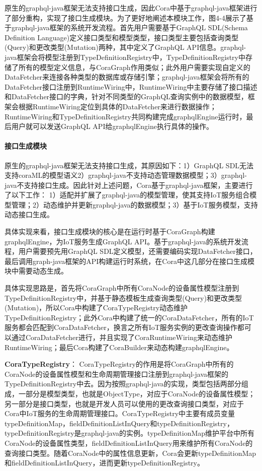 \documentclass[winfonts,master,twoside]{njuthesis}
\begin{document}
原生的graphql-java框架无法支持接口生成，因此Cora中基于graphql-java框架进行了部分重构，实现了接口生成模块。为了更好地阐述本模块工作，图4-4展示了基于graphql-java框架的系统开发流程。首先用户需要基于GraphQL SDL(Schema Definition Language)\cite{graphqlsdl}定义接口类型和模型类型，接口类型主要包括查询类型(Query)和更改类型(Mutation)两种，其中定义了GraphQL API信息。graphql-java框架会将模型注册到TypeDefinitionRegistry中，TypeDefinitionRegistry中存储了所有的模型定义信息，与CoraGraph作用类似；此外用户需要实现自定义的DataFetcher来连接各种类型的数据库或存储引擎；graphql-java框架会将所有的DataFetcher接口注册到RuntimeWiring中，RuntimeWiring中主要存储了接口描述和DataFetcher接口的字典，针对不同类型的GraphQL查询实例中的数据模型，框架会根据RuntimeWiring定位到具体的DataFetcher来进行数据操作；RuntimeWiring和TypeDefinitionRegistry共同构建完成graphqlEngine运行时，最后用户就可以发送GraphQL API给graphqlEngine执行具体的操作。

\paragraph{接口生成模块}
原生的graphql-java框架无法支持接口生成，其原因如下：1）GraphQL SDL无法支持coraML的模型语义2）graphql-java不支持动态管理数据模型；3）graphql-java不支持接口生成。因此针对上述问题，Cora基于graphql-java框架，主要进行了以下工作： 1）适配并扩展了graphql-java的模型管理，使其支持IoT服务组合模型管理；2）动态维护并更新graphql-java的数据模型；3）基于IoT服务模型，支持动态接口生成。


具体实现来看，接口生成模块的核心是在运行时基于CoraGraph构建graphqlEngine，为IoT服务生成GraphQL API。基于graphql-java的系统开发流程，用户需要预先用GraphQL SDL定义模型，还需要编码实现DataFetcher接口，最后调用graph-java框架的API构建运行时系统，在Cora中这几部分在接口生成模块中需要动态生成。

具体实现思路是，首先将CoraGraph中所有CoraNode的设备属性模型注册到TypeDefinitionRegistry中，并基于静态模板生成查询类型(Query)和更改类型(Mutation)，所以Cora中构建了CoraTypeRegistry动态维护TypeDefinitionRegistry；此外Cora中构建了统一的CoraDataFetcher，所有的IoT服务都会匹配到CoraDataFetcher，换言之所有IoT服务实例的更改查询操作都可以通过CoraDataFetcher进行，并且实现了CoraRuntimeWiring来动态维护RuntimeWiring；最后Cora构建了CoraBuilder来动态构建graphqlEngine。

\textbf{CoraTypeRegistry}：
CoraTypeRegistry的作用是将CoraGraph中所有的CoraNode的设备属性模型和生命周期管理接口注册到graphql-java框架的TypeDefinitionRegistry中去。因为按照graphql-java的实现，类型包括两部分组成，一部分是模型类型，也就是ObjectType，对应于CoraNode的设备属性模型；另一部分是接口类型，也就是开发人员可以使用的更改查询接口类型，对应于Cora中IoT服务的生命周期管理接口。CoraTypeRegistry中主要有成员变量typeDefinitionMap，fieldDefinitionListInQuery和typeDefinitionRegistry，typeDefinitionRegistry是graphql-java的实例。typeDefinitionMap维护平台中所有CoraNode的设备属性类型，fieldDefinitionListInQuery用来维护所有CoraNode的查询接口类型。随着CoraNode中的属性信息更新，Cora会更新typeDefinitionMap和fieldDefinitionListInQuery，进而更新typeDefinitionRegistry。
\end{document}
